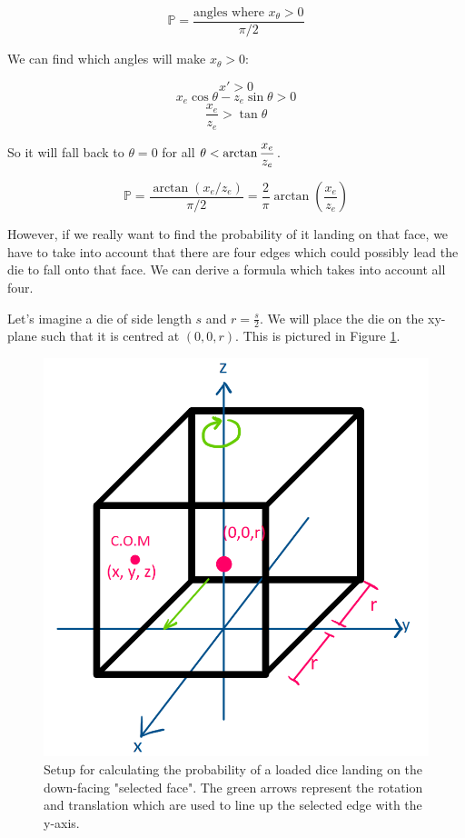\documentclass[english,12pt,a4paper,final]{article}
\begin{document}
\begin{equation*}
	 \mathbb{P} = \frac{\text{angles where $x_{\theta} > 0$}}{\pi/2}
\end{equation*}

We can find which angles will make $x_{\theta} > 0$:

\begin{equation*}
	x' > 0
\end{equation*}
\begin{equation*}
	x_e\cos\theta - z_e\sin\theta > 0
\end{equation*}
\begin{equation*}
	\frac{x_e}{z_e} > \tan\theta
\end{equation*}

So it will fall back to $\theta=0$ for all $\theta < \arctan\mathlarger{\frac{x_e}{z_e}}$.

\begin{equation}\label{dieEdgeProb}
	\mathbb{P} = \frac{\arctan(x_e/z_e)}{\pi/2} = \frac{2}{\pi} \arctan\left(\frac{x_e}{z_e}\right)
\end{equation}

However, if we really want to find the probability of it landing on that face, we have to take into account that there are four edges which could possibly lead the die to fall onto that face. We can derive a formula which takes into account all four.

Let's imagine a die of side length $s$ and $r=\frac{s}{2}$. We will place the die on the xy-plane such that it is centred at $(0, 0, r)$. This is pictured in Figure \ref{fig:loadeddie3d}.

\begin{figure}[H]
	\centering
	\includegraphics[width=0.7\linewidth]{loadedDie3d}
	\caption{Setup for calculating the probability of a loaded dice landing on the down-facing "selected face". The green arrows represent the rotation and translation which are used to line up the selected edge with the y-axis.}
	\label{fig:loadeddie3d}
\end{figure}
\end{document}
